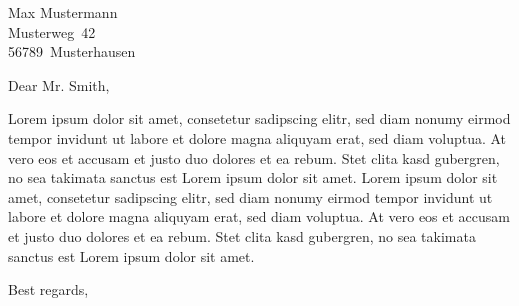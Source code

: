 \documentclass[lettersetup, DIV12]{scrlttr2}
\begin{document}
\begin{letter}{
  Max Mustermann \\
  Musterweg~42 \\
  56789~Musterhausen
}

\opening{Dear Mr. Smith,}

Lorem ipsum dolor sit amet, consetetur sadipscing elitr, sed diam nonumy eirmod tempor invidunt ut labore et dolore magna aliquyam erat, sed diam voluptua. At vero eos et accusam et justo duo dolores et ea rebum. Stet clita kasd gubergren, no sea takimata sanctus est Lorem ipsum dolor sit amet. Lorem ipsum dolor sit amet, consetetur sadipscing elitr, sed diam nonumy eirmod tempor invidunt ut labore et dolore magna aliquyam erat, sed diam voluptua. At vero eos et accusam et justo duo dolores et ea rebum. Stet clita kasd gubergren, no sea takimata sanctus est Lorem ipsum dolor sit amet.

\closing{Best regards,}

\end{letter}
\end{document}
